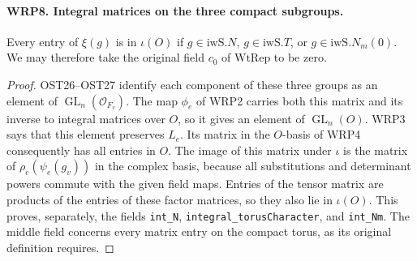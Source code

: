 \paragraph{WRP8. Integral matrices on the three compact subgroups.}
\label{claim:WRP8}
Every entry of $\xi(g)$ is in $\iota(O)$ if
$g\in\mathrm{iwS}.N$, $g\in\mathrm{iwS}.T$, or
$g\in\mathrm{iwS}.N_m(0)$.  We may therefore take the
original field $c_0$ of $\mathrm{WtRep}$ to be zero.
\begin{proof}
OST26--OST27 identify each component of these three groups
as an element of $\operatorname{GL}_n(\mathcal O_{F_v})$.
The map $\phi_e$ of WRP2 carries both this matrix and its
inverse to integral matrices over $O$, so it gives an
element of $\operatorname{GL}_n(O)$.  WRP3 says that this
element preserves $L_e$.  Its matrix in the $O$-basis
of WRP4 consequently has all entries in $O$.  The image
of this matrix under $\iota$ is the matrix of
$\rho_e(\psi_e(g_v))$ in the complex basis, because all
substitutions and determinant powers commute with the
given field maps.  Entries of the tensor matrix are
products of the entries of these factor matrices, so
they also lie in $\iota(O)$.  This proves, separately,
the fields \texttt{int\_N},
\texttt{integral\_torusCharacter}, and \texttt{int\_Nm}.
The middle field concerns every matrix entry on the compact
torus, as its original definition requires.
\end{proof}

